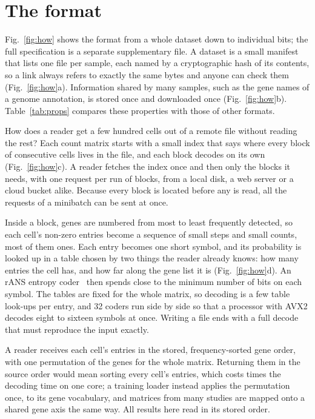 \section{The \sone{} format}
\label{sec:format}\label{sec:how}

Fig.~\ref{fig:how} shows the format from a whole dataset down to individual bits; the full specification is a separate
supplementary file. A dataset is a small manifest that lists one file per sample, each named by a cryptographic hash of
its contents, so a link always refers to exactly the same bytes and anyone can check them (Fig.~\ref{fig:how}a).
Information shared by many samples, such as the gene names of a genome annotation, is stored once and downloaded once
(Fig.~\ref{fig:how}b). Table~\ref{tab:props} compares these properties with those of other formats.

How does a reader get a few hundred cells out of a remote file without reading the rest?
Each count matrix starts with a small index that says where every block of consecutive cells lives in the file, and each
block decodes on its own (Fig.~\ref{fig:how}c). A reader fetches the index once and then only the blocks it needs, with one
request per run of blocks, from a local disk, a web server or a cloud bucket alike. Because every block is located before
any is read, all the requests of a minibatch can be sent at once.

Inside a block, genes are numbered from most to least frequently detected, so each cell's
non-zero entries become a sequence of small steps and small counts, most of them ones. Each entry becomes one short
symbol, and its probability is looked up in a table chosen by two things the reader already knows: how many entries the
cell has, and how far along the gene list it is (Fig.~\ref{fig:how}d). An rANS entropy coder~\cite{duda2013asymmetric}
then spends close to the minimum number of bits on each symbol. The tables are fixed for the whole matrix, so decoding is
a few table look-ups per entry, and 32 coders run side by side so that a processor with AVX2 decodes eight to sixteen
symbols at once. Writing a file ends with a full decode that must reproduce the input exactly.




A reader receives each cell's entries in the stored, frequency-sorted gene order, with one
permutation of the genes for the whole matrix. Returning them in the source order would mean sorting every cell's entries,
which costs  times the decoding time on one core; a training loader instead applies the permutation once, to
its gene vocabulary, and matrices from many studies are mapped onto a shared gene axis the same way. All results here read
\sone{} in its stored order.
